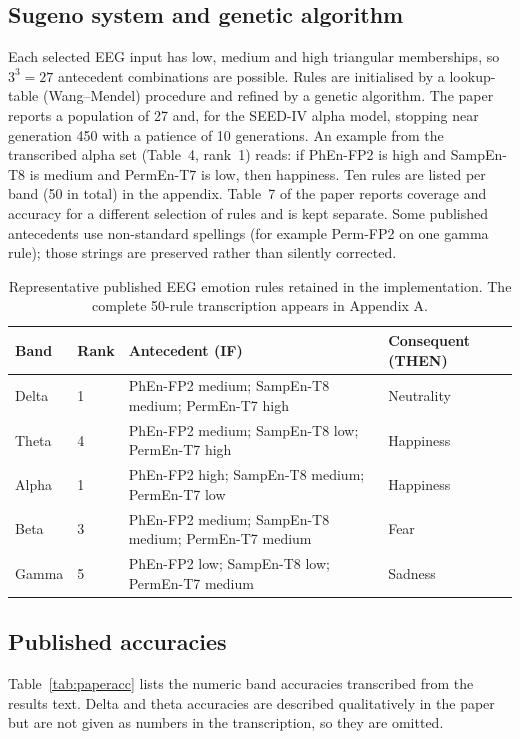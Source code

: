 \subsection{Sugeno system and genetic algorithm}
Each selected EEG input has low, medium and high triangular memberships, so $3^3=27$ antecedent combinations are possible. Rules are initialised by a lookup-table (Wang--Mendel) procedure \cite{WangMendel1992} and refined by a genetic algorithm. The paper reports a population of 27 and, for the SEED-IV alpha model, stopping near generation 450 with a patience of 10 generations. An example from the transcribed alpha set (Table~4, rank~1) reads: if PhEn-FP2 is high and SampEn-T8 is medium and PermEn-T7 is low, then happiness. Ten rules are listed per band (50 in total) in the appendix. Table~7 of the paper reports coverage and accuracy for a different selection of rules and is kept separate. Some published antecedents use non-standard spellings (for example Perm-FP2 on one gamma rule); those strings are preserved rather than silently corrected.

\begin{table}[t]
\centering
\caption{Representative published EEG emotion rules retained in the implementation. The complete 50-rule transcription appears in Appendix A.}
\label{tab:rules}
\scriptsize
\begin{tabularx}{\linewidth}{@{}llXl@{}}
\toprule
Band & Rank & Antecedent (IF) & Consequent (THEN) \\
\midrule
Delta & 1 & PhEn-FP2 medium; SampEn-T8 medium; PermEn-T7 high & Neutrality \\
Theta & 4 & PhEn-FP2 medium; SampEn-T8 low; PermEn-T7 high & Happiness \\
Alpha & 1 & PhEn-FP2 high; SampEn-T8 medium; PermEn-T7 low & Happiness \\
Beta & 3 & PhEn-FP2 medium; SampEn-T8 medium; PermEn-T7 medium & Fear \\
Gamma & 5 & PhEn-FP2 low; SampEn-T8 low; PermEn-T7 medium & Sadness \\
\bottomrule
\end{tabularx}
\end{table}

\subsection{Published accuracies}
Table~\ref{tab:paperacc} lists the numeric band accuracies transcribed from the results text. Delta and theta accuracies are described qualitatively in the paper but are not given as numbers in the transcription, so they are omitted.

